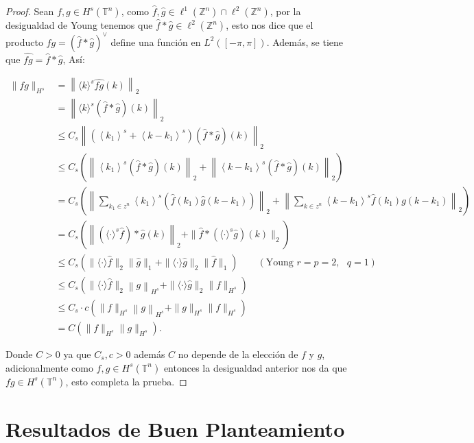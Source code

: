 \documentclass[12pt]{article}
\newcommand\T{\mathbb{T}}
\renewcommand{\hat}{\widehat}
\begin{document}
\begin{proof}
Sean $f,g\in H^s(\T^n)$, como $\widehat{f}, \widehat{g} \in \ell^1(\mathbb{Z}^n) \cap \ell^2(\mathbb{Z}^n)$, por la desigualdad de Young tenemos que $\widehat{f} * \widehat{g} \in \ell^2(\mathbb{Z}^n)$, esto nos dice que el producto $f g=(\widehat{f} * \widehat{g})^{\vee}$ define una función en $L^2([-\pi, \pi])$. Además, se tiene que $\widehat{f g}=\widehat{f} * \widehat{g}$, Así:

$$
\begin{aligned}
\|f g\|_{H^s}& =\left\|\langle k\rangle^s \hat{f g}(k)\right\|_2\\
&=\left\|\langle k\rangle^s(\hat{f} * \hat{g})(k)\right\|_2 \\
& \leq C_s\left\|\left(\left\langle k_1\right\rangle^s+\left\langle k-k_1\right\rangle^s\right)(\hat{f}*\hat{g})(k)\right\|_2 \\
& \leq C_s\left.\left(\left\|\left\langle k_1\right\rangle^s(\hat{f} * \hat{g})(k)\right\|_2+\left\|\left\langle k-k_1\right\rangle^s(\hat{f} * \hat{g})(k)\right\|_2\right)\right. \\
& =C_s\left(\left\|\sum_{k_1 \in z^n}\left\langle k_1\right\rangle^s\left(\hat{f}\left(k_1\right) \hat{g}\left(k-k_1\right)\right)\right\|_2+\left\|\sum_{k \in z^n}\left\langle k-k_1\right\rangle^s \hat{f}\left(k_1\right) g\left(k-k_1\right)\right\|_2\right) \\
& =C_s\left(\left\|\left(\langle\cdot\rangle^s \hat{f}\right) * \hat{g}(k)\right\|_2+\| \hat{f} *\left(\langle\cdot\rangle^s \hat{g}\right)(k) \|_2\right)\\
&\leq C_s\left(\|\langle\cdot\rangle \hat{f}\|_2\|\hat{g}\|_1+\|\langle\cdot\rangle \hat{g}\|_2\|\hat{f}\|_1\right) \quad \quad (\text{Young }r=p=2,\text{ } q=1) \\
& \leq C_s\left(\|\langle\cdot\rangle \hat{f}\|_2\left\|g\right\|_{H^s}+\|\langle\cdot\rangle \hat{g}\|_2\|f\|_{H^s}\right) \\
& \leq C_s\cdot c\left(\|f\|_{H^s}\left\|g\right\|_{H^s}+\|g\|_{H^s}\|f\|_{H^s}\right) \\
& =C\left(\|f\|_{H^s}\|g\|_{H^s}\right).
\end{aligned}
$$

Donde $C>0$ ya que $C_s,c>0$ además $C$ no depende de la elección de $f$ y $g$, adicionalmente como $f,g\in H^s(\T^n)$ entonces la desigualdad anterior nos da que $fg\in H^s(\T^n)$, esto  completa  la prueba.

\end{proof}


\section{Resultados de Buen Planteamiento}

\newpage



\nocite{*}
\end{document}
